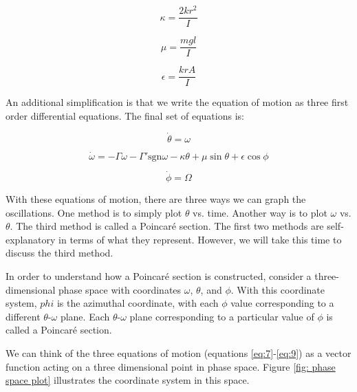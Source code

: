 \documentclass[twocolumn,amsmath,amssymb,pra, floatfix]{revtex4-2}
\begin{document}
\begin{equation}
    \kappa = \frac{2kr^{2}}{I}
    \label{eq:4}
\end{equation}

\begin{equation}
    \mu = \frac{mgl}{I}
    \label{eq:5}
\end{equation}

\begin{equation}
    \epsilon = \frac{krA}{I}
    \label{eq:6}
\end{equation}

An additional simplification is that we write the equation of motion as three first order differential equations. The final set of equations is:

\begin{equation}
    \dot{\theta} = \omega
    \label{eq:7}
\end{equation}

\begin{equation}
    \dot{\omega} = -\Gamma\omega - \Gamma' \mathrm{sgn}\omega - \kappa\theta + \mu \sin{\theta} + \epsilon \cos{\phi}
    \label{eq:8}
\end{equation}

\begin{equation}
    \dot{\phi} = \Omega
    \label{eq:9}
\end{equation}

With these equations of motion, there are three ways we can graph the oscillations. One method is to simply plot $\theta$ vs. time. Another way is to plot $\omega$ vs. $\theta$. The third method is called a Poincar\'{e} section. The first two methods are self-explanatory in terms of what they represent. However, we will take this time to discuss the third method.

In order to understand how a Poincar\'{e} section is constructed, consider a three-dimensional phase space with coordinates $\omega$, $\theta$, and $\phi$. With this coordinate system, $phi$ is the azimuthal coordinate, with each $\phi$ value corresponding to a different $\theta$-$\omega$ plane. Each $\theta$-$\omega$ plane corresponding to a particular value of $\phi$ is called a Poincar\'{e} section.

We can think of the three equations of motion (equations \ref{eq:7}-\ref{eq:9}) as a vector function acting on a three dimensional point in phase space. Figure \ref{fig: phase space plot} illustrates the coordinate system in this space.
\end{document}
